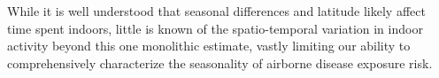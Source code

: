 \documentclass{article}
\begin{document}
While it is well understood that seasonal differences and latitude likely affect time spent indoors, little is known of the spatio-temporal variation in indoor activity beyond this one monolithic estimate, vastly limiting our ability to comprehensively characterize the seasonality of airborne disease exposure risk. 
\end{document}
